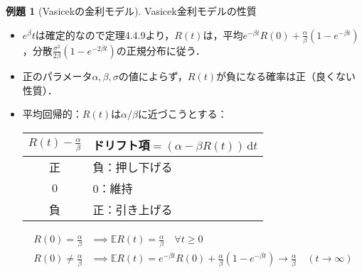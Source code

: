 \documentclass[a4paper, lualatex, ja=standard]{bxjsarticle}
\theoremstyle{definition}
\newtheorem{expl}[thm]{例題}
\newcommand{\E}{\mathbb{E}}
\newcommand{\diff}{\mathrm{d}}
\begin{document}
\begin{expl}[Vasicekの金利モデル]
  Vasicek金利モデルの性質
  \begin{itemize}
    \item $e^\beta t$は確定的なので定理4.4.9より，$R(t)$は，平均$e^{-\beta t}R(0) + \frac{\alpha}{\beta}(1-e^{-\beta t})$，分散$\frac{\sigma^2}{2\beta}(1-e^{-2\beta t})$の正規分布に従う．
    \item 正のパラメータ$\alpha,\beta,\sigma$の値によらず，$R(t)$が負になる確率は正（良くない性質）．
    \item 平均回帰的：$R(t)$は$\alpha/\beta$に近づこうとする：
    \begin{table}[h]
      \centering
      \begin{tabular}{cl}
        $R(t)-\frac{\alpha}{\beta}$ & ドリフト項$=(\alpha-\beta R(t))\,\diff t$ \\\hline
        正 & 負：押し下げる\\
        $0$ & $0$：維持\\
        負 & 正：引き上げる
      \end{tabular}
    \end{table}
    \begin{align*}
      R(0)=\frac{\alpha}{\beta} &\implies \E R(t) = \frac{\alpha}{\beta}\quad \forall t\geq0\\
      R(0)\neq \frac{\alpha}{\beta} &\implies \E R(t) = e^{-\beta t}R(0) + \frac{\alpha}{\beta}(1-e^{-\beta t})\to \frac{\alpha}{\beta}\quad (t\to\infty)
    \end{align*}
  \end{itemize}
\end{expl}
\end{document}

